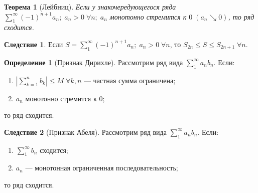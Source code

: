\documentclass[a4paper,12pt]{article}
\newtheorem*{theorem}{Теорема}
\theoremstyle{remark}
\theoremstyle{definition}
\newtheorem{definition}{Определение}
\newtheorem*{effect}{Следствие}
\begin{document}
\begin{theorem}[Лейбниц]
	Если у знакочередующегося ряда \(\sum_1^\infty (-1)^{n+1} a_n;\; a_n > 0 \;\forall n;\; a_n\) монотонно стремится к \(0\; (a_n \searrow 0)\), то ряд сходится. 
\end{theorem}

\begin{effect}
	Если \(S = \sum_1^\infty (-1)^{n+1} a_n;\; a_n > 0 \;\forall n\), то \(S_{2n} \leqslant S \leqslant S_{2n + 1} \;\forall n\).
\end{effect}


\begin{definition}[Признак Дирихле]
	Рассмотрим ряд вида \(\sum_1^\infty a_{n}b_{n}\). Если:
	\begin{enumerate}
		\item \(\left| \sum_{k=1}^{n} b_k \right| \leqslant M \;\forall k,n\) --- частная сумма ограничена;
		\item \(a_n\) монотонно стремится к \(0\);
	\end{enumerate}
	то ряд сходится.
\end{definition}

\begin{effect}[Признак Абеля]
	Рассмотрим ряд вида \(\sum_1^\infty a_{n}b_{n}\). Если:
	\begin{enumerate}
		\item \(\sum_1^\infty b_n\) сходится;
		\item \(a_n\) --- монотонная ограниченная последовательность;
	\end{enumerate}
	то ряд сходится.
\end{effect}
\end{document}
